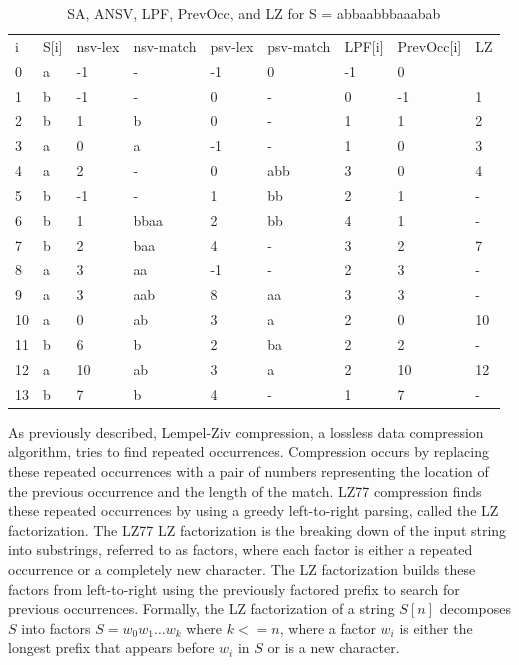 \begin{table}[ht!]
\centering
\begin{tabular}{lllllllll}
i  & S{[}i{]} & nsv-lex & nsv-match & psv-lex & psv-match & LPF{[}i{]} & PrevOcc{[}i{]} & LZ \\
0  & a        & -1      & -         & -1      & 0         & -1         & 0              &    \\
1  & b        & -1      & -         & 0       & -         & 0          & -1             & 1  \\
2  & b        & 1       & b         & 0       & -         & 1          & 1              & 2  \\
3  & a        & 0       & a         & -1      & -         & 1          & 0              & 3  \\
4  & a        & 2       & -         & 0       & abb       & 3          & 0              & 4  \\
5  & b        & -1      & -         & 1       & bb        & 2          & 1              & -  \\
6  & b        & 1       & bbaa      & 2       & bb        & 4          & 1              & -  \\
7  & b        & 2       & baa       & 4       & -         & 3          & 2              & 7  \\
8  & a        & 3       & aa        & -1      & -         & 2          & 3              & -  \\
9  & a        & 3       & aab       & 8       & aa        & 3          & 3              & -  \\
10 & a        & 0       & ab        & 3       & a         & 2          & 0              & 10 \\
11 & b        & 6       & b         & 2       & ba        & 2          & 2              & -  \\
12 & a        & 10      & ab        & 3       & a         & 2          & 10             & 12 \\
13 & b        & 7       & b         & 4       & -         & 1          & 7              & - 
\end{tabular}
\caption{SA, ANSV, LPF, PrevOcc, and LZ for S = abbaabbbaaabab}
\label{tab:allsolved}
\end{table}

As previously described, Lempel-Ziv compression, a lossless data compression algorithm, tries to find repeated occurrences.
Compression occurs by replacing these repeated occurrences with a pair of numbers representing the location of the previous occurrence and the length of the match.
LZ77 compression finds these repeated occurrences by using a greedy left-to-right parsing, called the LZ factorization.
The LZ77 LZ factorization is the breaking down of the input string into substrings, referred to as factors, where each factor is either a repeated occurrence or a completely new character.
The LZ factorization builds these factors from left-to-right using the previously factored prefix to search for previous occurrences.
Formally, the LZ factorization of a string $S[n]$ decomposes $S$ into factors $S = w_0 w_1 \ldots w_k$ where $k<=n$, where a factor $w_i$ is either the longest prefix that appears before $w_i$ in $S$ or is a new character.

